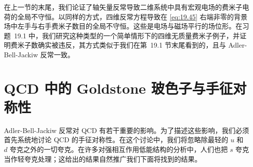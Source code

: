 在上一节的末尾，我们论证了轴矢量反常导致二维系统中具有宏观电场的费米子电荷的全局不守恒。以同样的方式，四维反常方程导致在 \eqref{eq:19.45} 右端非零的背景场中左手与右手费米子数目的全局不守恒。这些是电场与磁场平行的场位形。在习题~19.1 中，我们研究这种类型的一个简单情形下的四维无质量费米子例子，并证明费米子数确实被违反，其方式类似于我们在第~19.1 节末尾看到的，且与 Adler-Bell-Jackiw 反常一致。

\section{QCD 中的 Goldstone 玻色子与手征对称性}

Adler-Bell-Jackiw 反常对 QCD 有若干重要的影响。为了描述这些影响，我们必须首先系统地讨论 QCD 的手征对称性。在这个讨论中，我们将忽略除最轻的 $u$ 和 $d$ 夸克之外的一切夸克。在许多对强相互作用低能结构的分析中，人们也把 $s$ 夸克当作轻夸克处理；这给出的结果自然推广我们下面将找到的结果。

